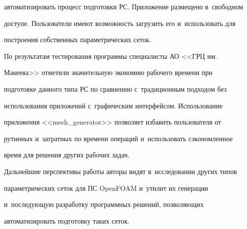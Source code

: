 автоматизировать процесс подготовки РС. Приложение размещено в~свободном 


доступе. Пользователи имеют возможность загрузить его и~использовать для 


построения собственных параметрических сеток.


  


  По результатам тестирования программы специалисты АО <<ГРЦ им.\ 


Ма\-ке\-ева>> отметили значительную экономию рабочего времени при 


подготовке данного типа РС по сравнению с~традиционным подходом без 


использования приложений с~графическим интерфейсом. Использование 


приложения <<mesh\_generator>> позволяет избавить пользователя от 


рутинных и~затратных по времени операций и~использовать сэкономленное 


время для решения других рабочих задач.


  


  Дальнейшие перспективы работы авторы видят в~исследовании других типов 


параметрических сеток для ПС OpenFOAM и~утилит их генерации 


и~последующую разработку программных решений, позволяющих 


автоматизировать подготовку таких сеток.


  


